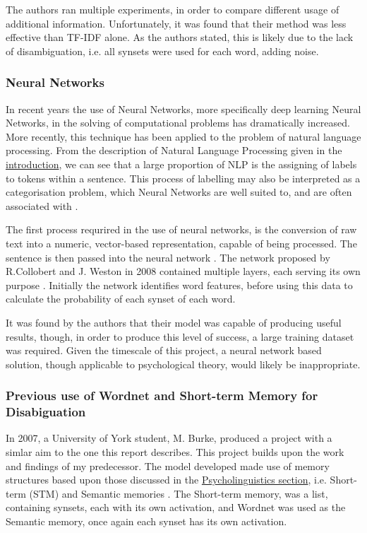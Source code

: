 \documentclass[]{article}
\begin{document}
The authors ran multiple experiments, in order to compare different usage of additional information. Unfortunately, it was found that their method was less effective than TF-IDF alone. As the authors stated, this is likely due to the lack of disambiguation, i.e. all synsets were used for each word, adding noise.

\subsubsection{Neural Networks}
\label{sec:NeuralNetwork}
In recent years the use of Neural Networks, more specifically deep learning Neural Networks, in the solving of computational problems has dramatically increased. More recently, this technique has been applied to the problem of natural language processing. From the description of Natural Language Processing given in the \hyperref[sec:IntroContext]{introduction}, we can see that a large proportion of NLP is the assigning of labels to tokens within a sentence. This process of labelling may also be interpreted as a categorisation problem, which Neural Networks are well suited to, and are often associated with \cite{NeuralNetworks}. 

The first process requrired in the use of neural networks, is the conversion of raw text into a numeric, vector-based representation, capable of being processed. The sentence is then passed into the neural network \cite{NeuralNetworks}. The network proposed by R.Collobert and J. Weston in 2008 contained multiple layers, each serving its own purpose \cite{NeuralNetworks}. Initially the network identifies word features, before using this data to calculate the probability of each synset of each word.

It was found by the authors that their model was capable of producing useful results, though, in order to produce this level of success, a large training dataset was required\cite{NeuralNetworks}. Given the timescale of this project, a neural network based solution, though applicable to psychological theory, would likely be inappropriate.
\subsubsection{Previous use of Wordnet and Short-term Memory for Disabiguation}
\label{sec:MattBurke}

In 2007, a University of York student, M. Burke, produced a project with a simlar aim to the one this report describes. This project builds upon the work and findings of my predecessor. The model developed made use of memory structures based upon those discussed in the \hyperref[sec:Psycholinguistics]{Psycholinguistics section}, i.e. Short-term (STM) and Semantic memories \cite{MattBurkePrevious}. The Short-term memory, was a list, containing synsets, each with its own activation, and Wordnet was used as the Semantic memory, once again each synset has its own activation.    
\end{document}
